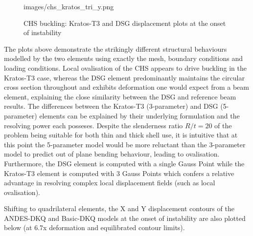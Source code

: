 \begin{figure}[H]
{		{images/chs_kratos_tri_y.png}}
	\caption{\label{chs buckling pics1}CHS buckling: Kratos-T3 and DSG displacement plots at the onset of instability}
\end{figure}

The plots above demonstrate the strikingly different structural behaviours modelled by the two elements using exactly the mesh, boundary conditions and loading conditions. Local ovalisation of the CHS appears to drive buckling in the Kratos-T3 case, whereas the DSG element predominantly maintains the circular cross section throughout and exhibits deformation one would expect from a beam element, explaining the close similarity between the DSG and reference beam results. The differences between the Kratos-T3 (3-parameter) and DSG (5-parameter) elements can be explained by their underlying formulation and the resolving power each posseses. Despite the slenderness ratio $R/t = 20$ of the problem being suitable for both thin and thick shell use, it is intuitive that at this point the 5-parameter model would be more reluctant than the 3-parameter model to predict out of plane bending behaviour, leading to ovalisation. Furthermore, the DSG element is computed with a single Gauss Point while the Kratos-T3 element is computed with 3 Gauss Points which confers a relative advantage in resolving complex local displacement fields (such as local ovalisation).

Shifting to quadrilateral elements, the X and Y displacement contours of the ANDES-DKQ and Basic-DKQ models at the onset of instability are also plotted below (at 6.7x deformation and equilibrated contour limits).

